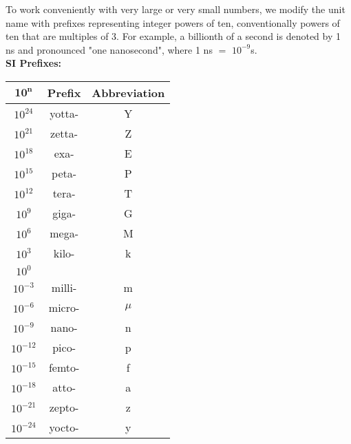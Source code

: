         \noindent To work conveniently with very large or very small numbers, we modify the unit name with prefixes representing integer powers of ten, conventionally powers of ten that are multiples of 3. For example,
        a billionth of a second is denoted by 1 ns and pronounced "one nanosecond", where 1 ns $=$ $10^{-9}$s. \\

        \noindent \textbf{SI Prefixes:}

        \begin{center}
            \begin{tabular}{|c|c|c|}
                \hline
                $\bm{10^n}$ & \textbf{Prefix}   & \textbf{Abbreviation} \\
                \hline
                $10^{24}$   & yotta-            & Y \\
                \hline
                $10^{21}$   & zetta-            & Z \\
                \hline
                $10^{18}$   & exa-              & E \\
                \hline
                $10^{15}$   & peta-             & P \\
                \hline
                $10^{12}$   & tera-             & T \\
                \hline
                $10^9$      & giga-             & G \\
                \hline
                $10^6$      & mega-             & M \\
                \hline
                $10^3$      & kilo-             & k \\
                \hline
                $10^0$      & \sout{     }      & \sout{  } \\
                \hline
                $10^{-3}$   & milli-            & m \\
                \hline
                $10^{-6}$   & micro-            & $\mu$ \\
                \hline
                $10^{-9}$   & nano-             & n \\
                \hline
                $10^{-12}$  & pico-             & p \\
                \hline
                $10^{-15}$  & femto-            & f \\
                \hline
                $10^{-18}$  & atto-             & a \\
                \hline
                $10^{-21}$  & zepto-            & z \\
                \hline
                $10^{-24}$  & yocto-            & y \\
                \hline
            \end{tabular}
        \end{center}

